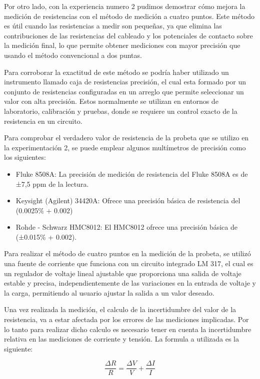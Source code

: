 Por otro lado, con la experiencia numero 2 pudimos demostrar cómo mejora la medición de resistencias con el método de medición a cuatro puntos. Este método es útil cuando las resistencias a medir son pequeñas, ya que elimina las contribuciones de las resistencias del  cableado y los potenciales de contacto sobre la medición final, lo que permite obtener mediciones con mayor precisión que usando el método convencional a dos puntas. 

Para corroborar la exactitud de este método se podría haber utilizado un instrumento llamado caja de resistencias precisión, el cual esta formado por un conjunto de resistencias configuradas en un arreglo que permite seleccionar un valor con alta precisión. Estos normalmente se utilizan en entornos de laboratorio, calibración y pruebas, donde se requiere un control exacto de la resistencia en un circuito. 

Para comprobar el verdadero valor de resistencia de la probeta que se utilizo en la experimentación 2, se puede emplear algunos multímetros de precisión como los siguientes: 
\begin{itemize}
    \item Fluke 8508A: La precisión de medición de resistencia del Fluke 8508A es de ±7,5 ppm de la lectura.
    \item Keysight (Agilent) 34420A: Ofrece una precisión básica de resistencia del (0.0025\% + 0.002)
    \item Rohde - Schwarz HMC8012: El HMC8012 ofrece una precisión básica de (±0.015\% + 0.002).
\end{itemize}

Para  realizar el método de cuatro puntos en la medición de la probeta, se utilizó una fuente de corriente que funciona con un circuito integrado LM 317, el cual es un regulador de voltaje lineal ajustable que proporciona una salida de voltaje estable y precisa, independientemente de las variaciones en la entrada de voltaje y la carga, permitiendo al usuario ajustar la salida a un valor deseado.

Una vez realizada la medición, el calculo de la incertidumbre del valor de la resistencia, va a estar afectada por los errores de las mediciones implicadas. Por lo tanto para realizar dicho calculo es necesario tener en cuenta la incertidumbre relativa en las mediciones de corriente y tensión. La formula a utilizada es la siguiente:  

\begin{equation}
    \frac{\Delta R}{R} = \frac{\Delta V}{V} + \frac{\Delta I}{I}
    \label{sumaErr}
\end{equation}

